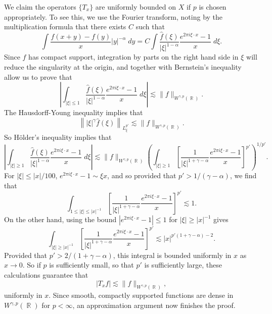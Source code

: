 \documentclass[answers]{exam}
\DeclareMathOperator{\RR}{\mathbb{R}}
\begin{document}
\begin{questions}
\begin{parts}
\begin{solution}
    	We claim the operators $\{ T_x \}$ are uniformly bounded on $X$ if $p$ is chosen appropriately. To see this, we use the Fourier transform, noting by the multiplication formula that there exists $C$ such that
    	\[ \int \frac{f(x + y) - f(y)}{x} |y|^{-\alpha}\; dy = C \int \frac{\widehat{f}(\xi)}{|\xi|^{1 - \alpha}} \frac{e^{2 \pi i \xi \cdot x} - 1}{x}\; d\xi. \]
    	Since $f$ has compact support, integration by parts on the right hand side in $\xi$ will reduce the singularity at the origin, and together with Bernstein's inequality allow us to prove that
    	\[ \left| \int_{|\xi| \leq 1} \frac{\widehat{f}(\xi)}{|\xi|^{1 - \alpha}} \frac{e^{2 \pi i \xi \cdot x} - 1}{x}\; d\xi \right| \lesssim \| f \|_{W^{\gamma,p}(\RR)}. \]
    	The Hausdorff-Young inequality implies that
    	\[ \left\| |\xi|^\gamma \widehat{f}(\xi) \right\|_{L^{p'}_\xi} \lesssim \| f \|_{W^{\gamma,p}(\RR)}. \]
    	So H\"{o}lder's inequality implies that
    	\[ \left| \int_{|\xi| \geq 1} \frac{\widehat{f}(\xi)}{|\xi|^{1 - \alpha}} \frac{e^{2 \pi i \xi \cdot x} - 1}{x}\; d\xi \right| \lesssim \| f \|_{W^{\gamma,p}(\RR)} \left( \int_{|\xi| \geq 1} \left[ \frac{1}{|\xi|^{1 + \gamma - \alpha}} \frac{e^{2 \pi i \xi \cdot x} - 1}{x} \right]^{p'} \right)^{1/p'}. \]
    	For $|\xi| \leq |x| / 100$, $e^{2 \pi i \xi \cdot x} - 1 \sim \xi x$, and so provided that $p' > 1/(\gamma - \alpha)$, we find that
    	\[ \int_{1 \leq |\xi| \leq |x|^{-1}} \left[ \frac{1}{|\xi|^{1 + \gamma - \alpha}} \frac{e^{2 \pi i \xi \cdot x} - 1}{x} \right]^{p'} \lesssim 1. \]
    	On the other hand, using the bound $|e^{2 \pi i \xi \cdot x} - 1| \leq 1$ for $|\xi| \geq |x|^{-1}$ gives
    	\[ \int_{|\xi| \geq |x|^{-1}} \left[ \frac{1}{|\xi|^{1 + \gamma - \alpha}} \frac{e^{2 \pi i \xi \cdot x} - 1}{x} \right]^{p'} \lesssim |x|^{p'(1 + \gamma - \alpha) - 2}. \]
    	Provided that $p' > 2/(1 + \gamma - \alpha)$, this integral is bounded uniformly in $x$ as $x \to 0$. So if $p$ is sufficiently small, so that $p'$ is sufficiently large, these calculations guarantee that
    	\[ |T_x f| \lesssim \| f \|_{W^{\gamma,p}(\RR)}, \]
    	uniformly in $x$. Since smooth, compactly supported functions are dense in $W^{\gamma,p}(\RR)$ for $p < \infty$, an approximation argument now finishes the proof.


\end{solution}
\end{parts}
\end{questions}
\end{document}
